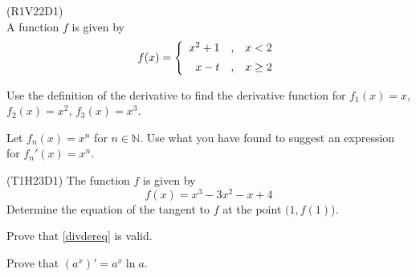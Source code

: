 \newpage
{}
(R1V22D1)\\
A function $ f $ is given by
\begin{equation*}
	f(x)= \left\lbrace{
		\begin{array}{rcr}
			x^2+1 &,&x<2 \br
			x-t   &,& x\geq 2
		\end{array}
	}\right. 
\end{equation*}

Use the definition of the derivative to find the derivative function for $ {f_1(x)=x} $, ${f_2(x)=x^2} $, ${f_3(x)= x^3} $. \os

Let $ f_n(x)=x^n $ for $ n\in \mathbb{N} $. Use what you have found to suggest an expression for $ f_n'(x)=x^n $.

 (T1H23D1)\os
The function $ f $ is given by
\[ f(x)=x^3-3x^2-x+4\]
Determine the equation of the tangent to $ f $ at the point $ (1, f(1) $).

Prove that \eqref{divdereq} is valid.

Prove that $ \left(a^x\right)'= a^x\ln a $.

\newpage
{}

